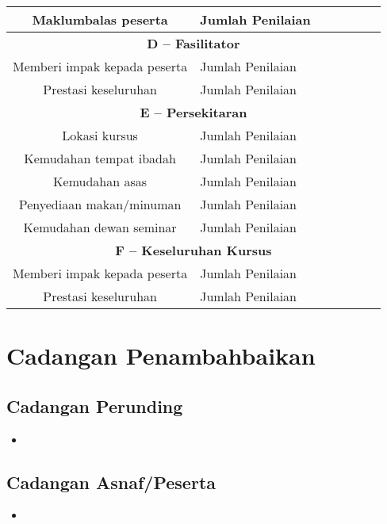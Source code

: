\documentclass[a4paper,12pt]{article}
\begin{document}
\begin{tabular}{|c|p{6cm}|c|c|c|c|c|}
    \hline
    Maklumbalas peserta & Jumlah Penilaian &  &  &  &  &  \\
    \hline
    \multicolumn{7}{|c|}{\textbf{D – Fasilitator}} \\
    \hline
    Memberi impak kepada peserta & Jumlah Penilaian &  &  &  &  &  \\
    \hline
    Prestasi keseluruhan & Jumlah Penilaian &  &  &  &  &  \\
    \hline
    \multicolumn{7}{|c|}{\textbf{E – Persekitaran}} \\
    \hline
    Lokasi kursus & Jumlah Penilaian &  &  &  &  &  \\
    \hline
    Kemudahan tempat ibadah & Jumlah Penilaian &  &  &  &  &  \\
    \hline
    Kemudahan asas & Jumlah Penilaian &  &  &  &  &  \\
    \hline
    Penyediaan makan/minuman & Jumlah Penilaian &  &  &  &  &  \\
    \hline
    Kemudahan dewan seminar & Jumlah Penilaian &  &  &  &  &  \\
    \hline
    \multicolumn{7}{|c|}{\textbf{F – Keseluruhan Kursus}} \\
    \hline
    Memberi impak kepada peserta & Jumlah Penilaian &  &  &  &  &  \\
    \hline
    Prestasi keseluruhan & Jumlah Penilaian &  &  &  &  &  \\
    \hline
\end{tabular}

\section{Cadangan Penambahbaikan}
\subsection{Cadangan Perunding}
\begin{itemize}
    \item []
\end{itemize}

\subsection{Cadangan Asnaf/Peserta}
\begin{itemize}
    \item []
\end{itemize}

\end{document}
